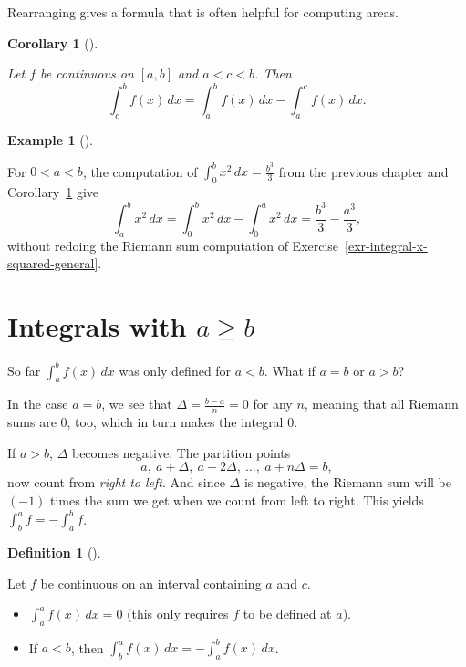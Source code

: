 \documentclass[
  letterpaper,
  DIV=11,
  numbers=noendperiod]{scrreprt}
\providecommand{\tightlist}{%
  \setlength{\itemsep}{0pt}\setlength{\parskip}{0pt}}
\theoremstyle{plain}
\theoremstyle{plain}
\theoremstyle{definition}
\newtheorem{definition}{Definition}[chapter]
\theoremstyle{definition}
\theoremstyle{definition}
\newtheorem{example}{Example}[chapter]
\theoremstyle{plain}
\theoremstyle{plain}
\newtheorem{corollary}{Corollary}[chapter]
\theoremstyle{remark}
\begin{document}
Rearranging gives a formula that is often helpful for computing areas.

\begin{corollary}[]\protect\hypertarget{cor-integral-difference}{}\label{cor-integral-difference}

\hfill\break
Let \(f\) be continuous on \([a,b]\) and \(a<c<b\). Then \[
\int_c^b f(x)\,dx = \int_a^b f(x)\,dx - \int_a^c f(x)\,dx .
\]

\end{corollary}

\begin{example}[]\protect\hypertarget{exm-x-squared-difference}{}\label{exm-x-squared-difference}

\hfill\break
For \(0<a<b\), the computation of \(\int_0^b x^2\,dx = \frac{b^3}{3}\)
from the previous chapter and Corollary~\ref{cor-integral-difference}
give \[
\int_a^b x^2\,dx = \int_0^b x^2\,dx - \int_0^a x^2\,dx = \frac{b^3}{3} - \frac{a^3}{3},
\] without redoing the Riemann sum computation of
Exercise~\ref{exr-integral-x-squared-general}.

\end{example}

\section{\texorpdfstring{Integrals with
\(a\ge b\)}{Integrals with a\textbackslash ge b}}\label{integrals-with-age-b}

So far \(\int_a^b f(x)\,dx\) was only defined for \(a<b\). What if
\(a=b\) or \(a>b\)?

In the case \(a=b\), we see that \(\Delta = \frac{b-a}{n} = 0\) for any
\(n\), meaning that all Riemann sums are \(0\), too, which in turn makes
the integral \(0\).

If \(a > b\), \(\Delta\) becomes negative. The partition points \[
a,\ a+\Delta,\ a+2\Delta,\ \ldots,\ a+n\Delta = b ,
\] now count from \emph{right to left}. And since \(\Delta\) is
negative, the Riemann sum will be \((-1)\) times the sum we get when we
count from left to right. This yields \(\int_b^a f = -\int_a^b f\).

\begin{definition}[]\protect\hypertarget{def-oriented-integral}{}\label{def-oriented-integral}

\hfill\break
Let \(f\) be continuous on an interval containing \(a\) and \(c\).

\begin{itemize}
\tightlist
\item
  \(\displaystyle\int_a^a f(x)\,dx = 0\) (this only requires \(f\) to be
  defined at \(a\)).
\item
  If \(a<b\), then
  \(\displaystyle\int_b^a f(x)\,dx = -\int_a^b f(x)\,dx\).
\end{itemize}

\end{definition}
\end{document}
